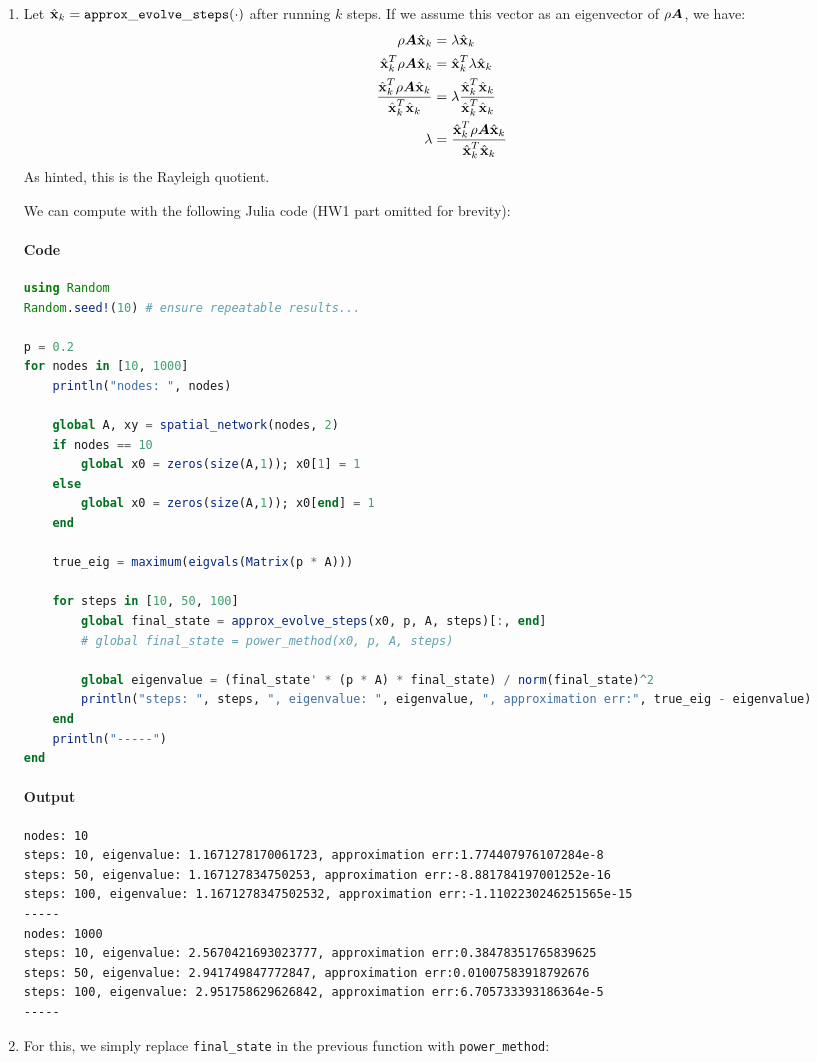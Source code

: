 \documentclass[]{exam}
\let\oldparagraph\paragraph
\renewcommand{\paragraph}[1]{\oldparagraph{#1}\mbox{}}
\begin{document}
\begin{questions}

\question
\hfill

\begin{enumerate}[label=\arabic*.]
	\item Let $\hat{\boldsymbol{\mathrm{x}}}_k = \mathtt{approx\_evolve\_steps}(\cdot)$ after running $k$ steps. If we assume this vector as an eigenvector of $\rho \boldsymbol{A}$, we have:
		\begin{align*}
			\rho \boldsymbol{A} \hat{\boldsymbol{\mathrm{x}}}_k &= \lambda \hat{\boldsymbol{\mathrm{x}}}_k \\
			\hat{\boldsymbol{\mathrm{x}}}_k^T \rho \boldsymbol{A} \hat{\boldsymbol{\mathrm{x}}}_k &= \hat{\boldsymbol{\mathrm{x}}}_k^T \lambda \hat{\boldsymbol{\mathrm{x}}}_k \\
			\frac{\hat{\boldsymbol{\mathrm{x}}}_k^T \rho \boldsymbol{A} \hat{\boldsymbol{\mathrm{x}}}_k}{\hat{\boldsymbol{\mathrm{x}}}_k^T \hat{\boldsymbol{\mathrm{x}}}_k} &= \lambda \frac{\hat{\boldsymbol{\mathrm{x}}}_k^T \hat{\boldsymbol{\mathrm{x}}}_k}{\hat{\boldsymbol{\mathrm{x}}}_k^T \hat{\boldsymbol{\mathrm{x}}}_k} \\
			\lambda &= \frac{\hat{\boldsymbol{\mathrm{x}}}_k^T \rho \boldsymbol{A} \hat{\boldsymbol{\mathrm{x}}}_k}{\hat{\boldsymbol{\mathrm{x}}}_k^T \hat{\boldsymbol{\mathrm{x}}}_k}
		\end{align*}
		As hinted, this is the Rayleigh quotient.

		We can compute with the following Julia code (HW1 part omitted for brevity):
		\paragraph{Code}
		\begin{lstlisting}[language=julia]
using Random
Random.seed!(10) # ensure repeatable results...

p = 0.2
for nodes in [10, 1000]
	println("nodes: ", nodes)

	global A, xy = spatial_network(nodes, 2)
	if nodes == 10
		global x0 = zeros(size(A,1)); x0[1] = 1
	else
		global x0 = zeros(size(A,1)); x0[end] = 1
	end

	true_eig = maximum(eigvals(Matrix(p * A)))

	for steps in [10, 50, 100]
		global final_state = approx_evolve_steps(x0, p, A, steps)[:, end]
		# global final_state = power_method(x0, p, A, steps)

		global eigenvalue = (final_state' * (p * A) * final_state) / norm(final_state)^2
		println("steps: ", steps, ", eigenvalue: ", eigenvalue, ", approximation err:", true_eig - eigenvalue)
	end
	println("-----")
end
		\end{lstlisting}
		\paragraph{Output}
		\begin{lstlisting}
nodes: 10
steps: 10, eigenvalue: 1.1671278170061723, approximation err:1.774407976107284e-8
steps: 50, eigenvalue: 1.167127834750253, approximation err:-8.881784197001252e-16
steps: 100, eigenvalue: 1.1671278347502532, approximation err:-1.1102230246251565e-15
-----
nodes: 1000
steps: 10, eigenvalue: 2.5670421693023777, approximation err:0.38478351765839625
steps: 50, eigenvalue: 2.941749847772847, approximation err:0.01007583918792676
steps: 100, eigenvalue: 2.951758629626842, approximation err:6.705733393186364e-5
-----
		\end{lstlisting}
	\item For this, we simply replace \texttt{final\_state} in the previous function with \texttt{power\_method}:

\end{enumerate}
\end{questions}
\end{document}
